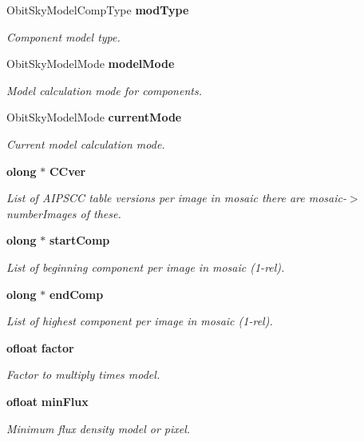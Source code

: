 \begin{CompactItemize}
Obit\-Sky\-Model\-Comp\-Type {\bf mod\-Type}
\begin{CompactList}\small\item\em Component model type. \item\end{CompactList}\item 
Obit\-Sky\-Model\-Mode {\bf model\-Mode}
\begin{CompactList}\small\item\em Model calculation mode for components. \item\end{CompactList}\item 
Obit\-Sky\-Model\-Mode {\bf current\-Mode}
\begin{CompactList}\small\item\em Current model calculation mode. \item\end{CompactList}\item 
{\bf olong} $\ast$ {\bf CCver}
\begin{CompactList}\small\item\em List of AIPSCC table versions per image in mosaic there are mosaic-$>$number\-Images of these. \item\end{CompactList}\item 
{\bf olong} $\ast$ {\bf start\-Comp}
\begin{CompactList}\small\item\em List of beginning component per image in mosaic (1-rel). \item\end{CompactList}\item 
{\bf olong} $\ast$ {\bf end\-Comp}
\begin{CompactList}\small\item\em List of highest component per image in mosaic (1-rel). \item\end{CompactList}\item 
{\bf ofloat} {\bf factor}
\begin{CompactList}\small\item\em Factor to multiply times model. \item\end{CompactList}\item 
{\bf ofloat} {\bf min\-Flux}
\begin{CompactList}\small\item\em Minimum flux density model or pixel. \item\end{CompactList}\item 

\end{CompactItemize}
